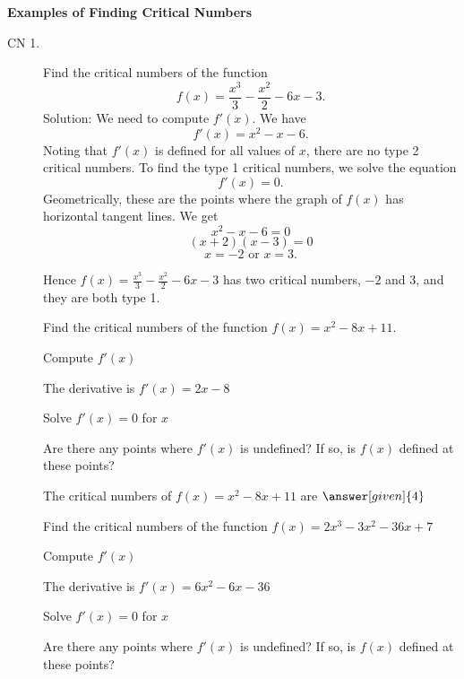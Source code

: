 \documentclass{ximera}
\begin{document}
\begin{center}
{\bf Examples of Finding Critical Numbers}
\end{center}
\begin{description}

\item[CN 1.] Find the critical numbers of the function 
\[f(x) = \dfrac{x^3}{3} - \dfrac{x^2}{2} - 6x - 3.\]
Solution: We need to compute $f'(x)$.  We have
\[f'(x) = x^2 - x - 6.\]
Noting that $f'(x)$ is defined for all values of $x$, there are no type 2 critical numbers.
To find the type 1 critical numbers, we solve the equation
\[f'(x) = 0.\]
Geometrically, these are the points where the graph of $f(x)$ has horizontal tangent lines.
We get
\[ x^2 - x - 6 =0\]
\[ (x+2)(x-3) =0\]
\[x = -2 \mbox{  or  } x = 3.\]

Hence $f(x) = \frac{x^3}{3} - \frac{x^2}{2} - 6x - 3$ has two critical numbers, $-2$ and $3$, and they are both type 1.

\begin{question} %
  Find the critical numbers of the function $f(x) = x^2 - 8x + 11$.
    \begin{hint}
      Compute $f'(x)$
    \end{hint}
    \begin{hint}
      The derivative is $f'(x) = 2x -8$
    \end{hint}
		\begin{hint}
      Solve $f'(x) = 0$ for $x$
    \end{hint}
    \begin{hint}
      Are there any points where $f'(x)$ is undefined?
      If so, is $f(x)$ defined at these points?  
		\end{hint}
    
    
		The critical numbers of $f(x) = x^2 - 8x + 11$ are
		 $\answer[given]{4}$
\end{question}


\begin{question} %
  Find the critical numbers of the function $f(x) = 2x^3 - 3x^2 -36x + 7$
    \begin{hint}
      Compute $f'(x)$
    \end{hint}
    \begin{hint}
      The derivative is $f'(x) = 6x^2 - 6x - 36$
    \end{hint}
		\begin{hint}
      Solve $f'(x) = 0$ for $x$
    \end{hint}
    \begin{hint}
      Are there any points where $f'(x)$ is undefined?
      If so, is $f(x)$ defined at these points?  
		\end{hint}
    

\end{question}
\end{description}
\end{document}
